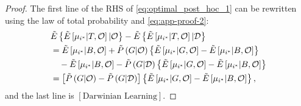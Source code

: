 \documentclass[12pt,english]{article}
\theoremstyle{plain}
\theoremstyle{plain}
\begin{document}
\begin{appendices}
\begin{proof}
    The first line of the RHS of \eqref{eq:optimal_post_hoc_1} can be rewritten using the law of total probability and \eqref{eq:app-proof-2}:
    \begin{align}    
    & \tilde{E}\left\{ \tilde{E}\left[\mu_{i^{\ast}}|T,\mathcal{O}\right]|\mathcal{O}\right\} 
      -\tilde{E}\left\{ \tilde{E}\left[\mu_{i^{\ast}}|T,\mathcal{O}\right]|\mathcal{D}\right\} \notag \\
    &= \tilde{E}\left[\mu_{i^{\ast}}|B,\mathcal{O}\right]
       + \tilde{P}\left(G|\mathcal{O}\right) 
         \left\{ \tilde{E}\left[\mu_{i^{\ast}}|G,\mathcal{O}\right]
         -\tilde{E}\left[\mu_{i^{\ast}}|B,\mathcal{O}\right]\right\} \notag \\
    &\quad -\tilde{E}\left[\mu_{i^{\ast}}|B,\mathcal{O}\right]
           -\tilde{P}\left(G|\mathcal{D}\right) 
           \left\{ 
            \tilde{E}\left[\mu_{i^{\ast}}|G,\mathcal{O}\right]
            -\tilde{E}\left[\mu_{i^{\ast}}|B,\mathcal{O}\right]
            \right\} \notag \\
    &= \left[\tilde{P}\left(G|\mathcal{O}\right)-\tilde{P}\left(G|\mathcal{D}\right)\right]
        \left\{ \tilde{E}\left[\mu_{i^{\ast}}|G,\mathcal{O}\right]
               -\tilde{E}\left[\mu_{i^{\ast}}|B,\mathcal{O}\right]\right\} 
       , \label{eq:optimal_post_hoc_2}
    \end{align}
    and the last line is $\left[\text{Darwinian Learning}\right]$.
\end{proof}

\end{appendices}

\newpage

\printbibliography
\end{document}
